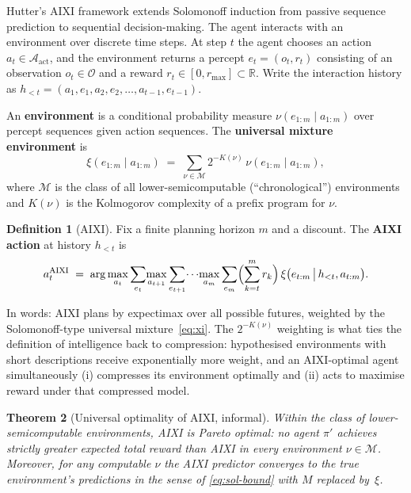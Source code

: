 \documentclass[12pt,a4paper]{article}
\theoremstyle{plain}
\newtheorem{theorem}{Theorem}[section]
\theoremstyle{definition}
\newtheorem{definition}[theorem]{Definition}
\begin{document}
Hutter's AIXI framework \citep{hutter2005universal} extends Solomonoff
induction from passive sequence prediction to sequential
decision-making.  The agent interacts with an environment over
discrete time steps.  At step $t$ the agent chooses an action $a_t
\in \mathcal{A}_{\mathrm{act}}$, and the environment returns a
percept $e_t = (o_t, r_t)$ consisting of an observation $o_t \in
\mathcal{O}$ and a reward $r_t \in [0, r_{\max}] \subset \mathbb{R}$.
Write the interaction history as
$h_{<t} = (a_1, e_1, a_2, e_2, \dots, a_{t-1}, e_{t-1})$.

An \textbf{environment} is a conditional probability measure
$\nu(e_{1:m} \mid a_{1:m})$ over percept sequences given action
sequences.  The \textbf{universal mixture environment} is
\begin{equation}
  \xi(e_{1:m} \mid a_{1:m})
  \;=\; \sum_{\nu \in \mathcal{M}} 2^{-K(\nu)}\,\nu(e_{1:m} \mid a_{1:m}),
  \label{eq:xi}
\end{equation}
where $\mathcal{M}$ is the class of all lower-semicomputable
(``chronological'') environments and $K(\nu)$ is the Kolmogorov
complexity of a prefix program for $\nu$.

\begin{definition}[AIXI]
\label{def:aixi}
Fix a finite planning horizon $m$ and a discount.  The \textbf{AIXI
action} at history $h_{<t}$ is
\begin{equation}
  a_t^{\text{AIXI}}
  \;=\; \arg\max_{a_t}
        \sum_{e_t}\!\max_{a_{t+1}}\sum_{e_{t+1}}\!\cdots\!\max_{a_m}\sum_{e_m}
        \Bigl(\sum_{k=t}^{m} r_k\Bigr)\,
        \xi\bigl(e_{t:m} \,\big|\, h_{<t}, a_{t:m}\bigr).
  \label{eq:aixi-rule}
\end{equation}
\end{definition}

In words: AIXI plans by expectimax over all possible futures, weighted
by the Solomonoff-type universal mixture~\eqref{eq:xi}.  The
$2^{-K(\nu)}$ weighting is what ties the definition of intelligence
back to compression: hypothesised environments with short descriptions
receive exponentially more weight, and an AIXI-optimal agent
simultaneously (i) compresses its environment optimally and (ii) acts
to maximise reward under that compressed model.

\begin{theorem}[Universal optimality of AIXI, informal]
\label{thm:aixi-opt}
Within the class of lower-semicomputable environments, AIXI is
\emph{Pareto optimal}: no agent $\pi'$ achieves strictly greater
expected total reward than AIXI in every environment $\nu \in
\mathcal{M}$.  Moreover, for any computable $\nu$ the AIXI predictor
converges to the true environment's predictions in the sense of
\eqref{eq:sol-bound} with $M$ replaced by~$\xi$.
\end{theorem}
\end{document}
